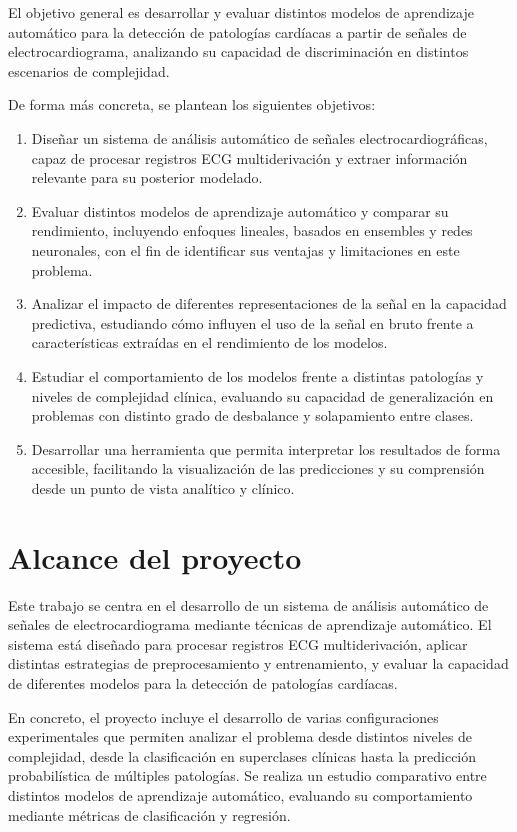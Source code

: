 \documentclass[12pt,a4paper,twoside]{book}
\begin{document}
El objetivo general es desarrollar y evaluar distintos modelos de aprendizaje automático para la detección de patologías cardíacas a partir de señales de electrocardiograma, analizando su capacidad de discriminación en distintos escenarios de complejidad.

De forma más concreta, se plantean los siguientes objetivos:

\begin{enumerate}
	\item Diseñar un sistema de análisis automático de señales electrocardiográficas, capaz de procesar registros ECG multiderivación y extraer información relevante para su posterior modelado.
	\item Evaluar distintos modelos de aprendizaje automático y comparar su rendimiento, incluyendo enfoques lineales, basados en ensembles y redes neuronales, con el fin de identificar sus ventajas y limitaciones en este problema.
	\item Analizar el impacto de diferentes representaciones de la señal en la capacidad predictiva, estudiando cómo influyen el uso de la señal en bruto frente a características extraídas en el rendimiento de los modelos.
	\item Estudiar el comportamiento de los modelos frente a distintas patologías y niveles de complejidad clínica, evaluando su capacidad de generalización en problemas con distinto grado de desbalance y solapamiento entre clases.
	\item Desarrollar una herramienta que permita interpretar los resultados de forma accesible, facilitando la visualización de las predicciones y su comprensión desde un punto de vista analítico y clínico.
\end{enumerate}

\section{Alcance del proyecto}

Este trabajo se centra en el desarrollo de un sistema de análisis automático de señales de electrocardiograma mediante técnicas de aprendizaje automático. 
El sistema está diseñado para procesar registros ECG multiderivación, aplicar distintas estrategias de preprocesamiento y entrenamiento, y evaluar la capacidad de diferentes modelos para la detección de patologías cardíacas.

En concreto, el proyecto incluye el desarrollo de varias configuraciones experimentales que permiten analizar el problema desde distintos niveles de complejidad, desde la clasificación en superclases clínicas hasta la predicción probabilística de múltiples patologías. 
Se realiza un estudio comparativo entre distintos modelos de aprendizaje automático, evaluando su comportamiento mediante métricas de clasificación y regresión.
\end{document}
